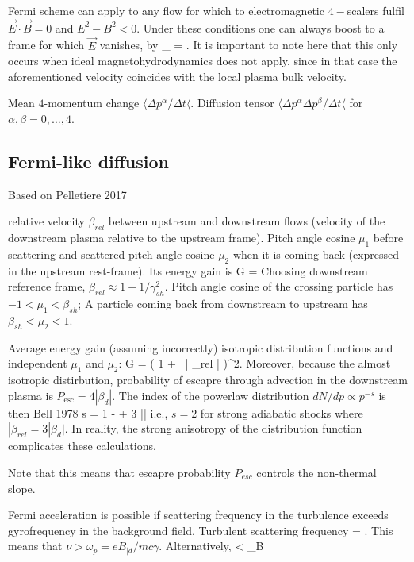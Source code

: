 \documentclass{aa}
\begin{document}
Fermi scheme can apply to any flow for which to electromagnetic $4-$scalers fulfil $\vec{E} \cdot \vec{B} = 0$ and $E^2 - B^2 < 0$.
Under these conditions one can always boost to a frame for which $\vec{E}$ vanishes, by
\be
\vec{\beta}_{} = .
\ee
It is important to note here that this only occurs when ideal magnetohydrodynamics does not apply, since in that case the aforementioned velocity coincides with the local plasma bulk velocity.


Mean $4$-momentum change $\langle \Delta p^\alpha / \Delta t \langle$.
Diffusion tensor $\langle \Delta p^\alpha \Delta p^\beta / \Delta t \langle$ for $\alpha,\beta = 0,\ldots,4$.

\subsection{Fermi-like diffusion}
Based on Pelletiere 2017

relative velocity $\beta_{rel}$ between upstream and downstream flows (velocity of the downstream plasma relative to the upstream frame).
Pitch angle cosine $\mu_1$ before scattering and scattered pitch angle cosine $\mu_2$ when it is coming back (expressed in the upstream rest-frame).
Its energy gain is 
\be
G = 
\ee
Choosing downstream reference frame, $\beta_{rel} \approx 1-1/\gamma_{sh}^2$.
Pitch angle cosine of the crossing particle has $-1 < \mu_1 < \beta_{sh}$; 
A particle coming back from downstream to upstream has $\beta_{sh} < \mu_2 < 1$.

Average energy gain (assuming incorrectly) isotropic distribution functions and independent $\mu_1$ and $\mu_2$:
\be
\langle G \rangle = \left( 1 +  | \beta_{rel} | \right)^2.
\ee
Moreover, because the almost isotropic distirbution, probability of escapre through advection in the downstream plasma is $ P_{\mathrm{esc}} = 4 | \beta_d | $.
The index of the powerlaw distribution $dN/dp \propto p^{-s}$ is then Bell 1978
\be
s = 1 -  
     + 3 ||
\ee
i.e., $s=2$ for strong adiabatic shocks where $|\beta_{rel} = 3 | \beta_d |$.
In reality, the strong anisotropy of the distribution function complicates these calculations.

Note that this means that escapre probability $P_{esc}$ controls the non-thermal slope.

Fermi acceleration is possible if scattering frequency in the turbulence exceeds gyrofrequency in the background field.
Turbulent scattering frequency
\be
\nu = .
\ee
This means that $\nu > \omega_p = e B_{|d}/m c \gamma$.
Alternatively,
\be
\sqrt{\sigma} < \zeta_B
\ee
\end{document}
